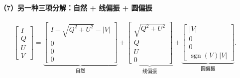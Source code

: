 \paragraph{（7）另一种三项分解：自然 + 线偏振 + 圆偏振}
\[
\begin{bmatrix} I\\ Q\\ U\\ V\end{bmatrix}
=
\underbrace{\begin{bmatrix} I-\sqrt{Q^2+U^2}-|V|\\ 0\\ 0\\ 0\end{bmatrix}}_{\text{自然}}
+
\underbrace{\begin{bmatrix} \sqrt{Q^2+U^2}\\ Q\\ U\\ 0\end{bmatrix}}_{\text{线偏振}}
+
\underbrace{\begin{bmatrix} |V|\\ 0\\ 0\\ \operatorname{sgn}(V)|V|\end{bmatrix}}_{\text{圆偏振}} .
\]

